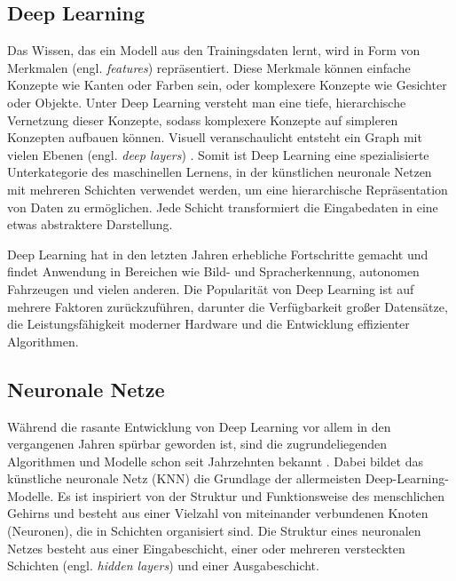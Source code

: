 \subsection{Deep Learning} \label{subsec-deep-learning}

Das Wissen, das ein Modell aus den Trainingsdaten lernt, wird in Form von Merkmalen (engl. \textit{features}) repräsentiert. Diese Merkmale können einfache Konzepte wie Kanten oder Farben sein, oder komplexere Konzepte wie Gesichter oder Objekte. Unter Deep Learning versteht man eine tiefe, hierarchische Vernetzung dieser Konzepte, sodass komplexere Konzepte auf simpleren Konzepten aufbauen können. Visuell veranschaulicht entsteht ein Graph mit vielen Ebenen (engl. \textit{deep layers}) \cite{}. Somit ist Deep Learning eine spezialisierte Unterkategorie des maschinellen Lernens, in der künstlichen neuronale Netzen mit mehreren Schichten verwendet werden, um eine hierarchische Repräsentation von Daten zu ermöglichen. Jede Schicht transformiert die Eingabedaten in eine etwas abstraktere Darstellung.

Deep Learning hat in den letzten Jahren erhebliche Fortschritte gemacht und findet Anwendung in Bereichen wie Bild- und Spracherkennung, autonomen Fahrzeugen und vielen anderen. Die Popularität von Deep Learning ist auf mehrere Faktoren zurückzuführen, darunter die Verfügbarkeit großer Datensätze, die Leistungsfähigkeit moderner Hardware und die Entwicklung effizienter Algorithmen. \cite{}

\subsection{Neuronale Netze} \label{subsec-neural-networks}

Während die rasante Entwicklung von Deep Learning vor allem in den vergangenen Jahren spürbar geworden ist, sind die zugrundeliegenden Algorithmen und Modelle schon seit Jahrzehnten bekannt \cite{}. Dabei bildet das künstliche neuronale Netz (KNN) die Grundlage der allermeisten Deep-Learning-Modelle. Es ist inspiriert von der Struktur und Funktionsweise des menschlichen Gehirns und besteht aus einer Vielzahl von miteinander verbundenen Knoten (Neuronen), die in Schichten organisiert sind. Die Struktur eines neuronalen Netzes besteht aus einer Eingabeschicht, einer oder mehreren versteckten Schichten (engl. \textit{hidden layers}) und einer Ausgabeschicht.


